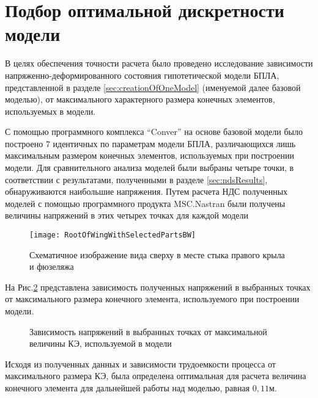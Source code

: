 \section{Подбор оптимальной дискретности модели}
\label{sec:optimalMKESize}

В целях обеспечения точности расчета было проведено исследование зависимости напряженно-деформированного состояния гипотетической модели БПЛА, представленной в разделе \ref{sec:creationOfOneModel} (именуемой далее базовой моделью), от максимального характерного размера конечных элементов, используемых в модели. 

С помощью программного комплекса ``Conver'' на основе базовой модели было построено 7 идентичных по параметрам модели БПЛА, различающихся лишь максимальным размером конечных элементов, используемых при построении модели. Для сравнительного анализа моделей были выбраны четыре точки, в соответствии с результатами, полученными в разделе \ref{sec:ndsResults}, обнаруживаются наибольшие напряжения. Путем расчета НДС полученных моделей с помощью программного продукта MSC.Nastran были получены величины напряжений в этих четырех точках для каждой модели


\begin{figure}[ht]
\centering
\texttt{[image: RootOfWingWithSelectedPartsBW]}
\caption{Схематичное изображение вида сверху в месте стыка правого крыла и фюзеляжа}
\label{fig:WingRootPlain}
\end{figure}




На Рис.\ref{fig:stressToDiscreteness} представлена зависимость полученных напряжений в выбранных точках от максимального размера конечного элемента, используемого при построении модели. 

\begin{figure}[H]
\centering

\caption{Зависимость напряжений в выбранных точках от максимальной величины КЭ, используемой в модели}
\label{fig:stressToDiscreteness}
\end{figure}

Исходя из полученных данных и зависимости трудоемкости процесса от максимального размера КЭ, была определена оптимальная для расчета величина конечного элемента для дальнейшей работы над моделью, равная $0,11\text{м}$. 



